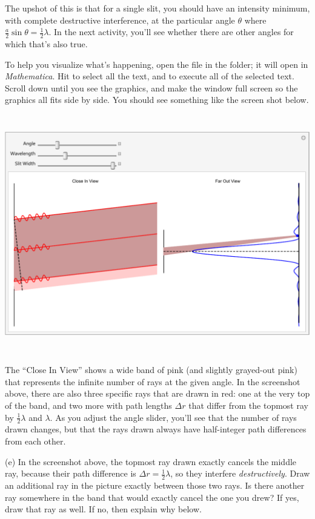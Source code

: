 The upshot of this is that for a single slit, you should have an intensity minimum, with complete destructive interference, at the particular angle $\theta$ where $\frac{a}{2} \sin \theta = \frac{1}{2}\lambda$.  In the next activity, you'll see whether there are other angles for which that's also true.

\pagebreak[3]
To help you visualize what's happening, open the file  in the \filename{\coursefolder} folder; 
it will open in \textit{Mathematica}.  Hit  to select all the text, and  
to execute all of the selected text.  Scroll down until you see the graphics, and make the window full screen so the graphics all fits side by side.  You should see something like the screen shot below.

{\centering \includegraphics[height=4.1in]{diffraction_of_light/one_slit_screengrab.pdf} \par}

The ``Close In View'' shows a wide band of pink (and slightly grayed-out pink) that represents the infinite number of rays at the given angle.  In the screenshot above, there are also three specific rays that are drawn in red: one at the very top of the band, and two more with path lengths $\Delta r$ that differ from the topmost ray by $\frac{1}{2} \lambda$ and $\lambda$.  As you adjust the angle slider, you'll see that the number of rays drawn changes, but that the rays drawn always have half-integer path differences from each other. 

(e) In the screenshot above, the topmost ray drawn exactly cancels the middle ray, because their path difference is $\Delta r = \frac{1}{2} \lambda$, so they interfere \textit{destructively}.  Draw an additional ray in the picture exactly between those two rays.  Is there another ray somewhere in the band that would exactly cancel the one you drew?  If yes, draw that ray as well.  If no, then explain why below.
\answerspace{0.5in}

